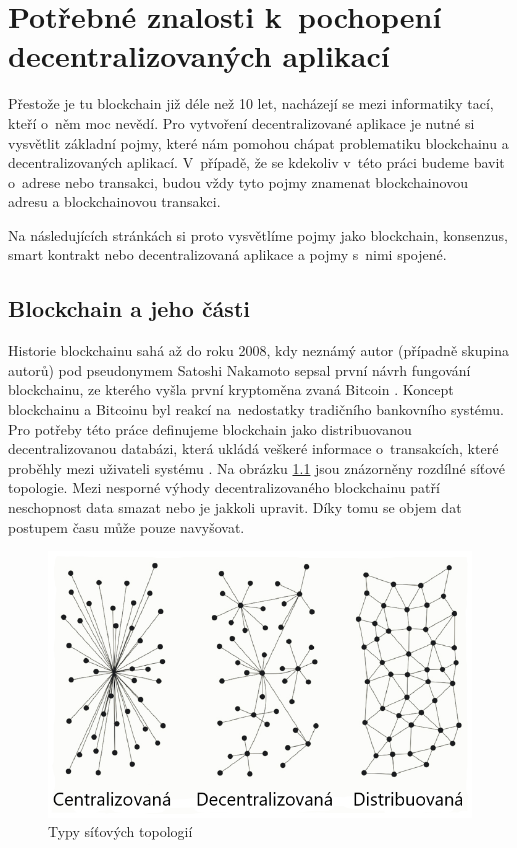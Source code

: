 \chapter{Potřebné znalosti k~pochopení decentralizovaných aplikací}
\label{chapter:2}
Přestože je tu blockchain již déle než 10 let, nacházejí se mezi informatiky tací, kteří o~něm moc nevědí. Pro vytvoření decentralizované aplikace je nutné si vysvětlit základní pojmy, které nám pomohou chápat problematiku blockchainu a decentralizovaných aplikací. V~případě, že se kdekoliv v~této práci budeme bavit o~adrese nebo transakci, budou vždy tyto pojmy znamenat blockchainovou adresu a blockchainovou transakci.

Na následujících stránkách si proto vysvětlíme pojmy jako blockchain, konsenzus, smart kontrakt nebo decentralizovaná aplikace a pojmy s~nimi spojené.

\section{Blockchain a jeho části}
Historie blockchainu sahá až do roku 2008, kdy neznámý autor (případně skupina autorů) pod pseudonymem Satoshi Nakamoto sepsal první návrh fungování blockchainu, ze kterého vyšla první kryptoměna zvaná Bitcoin \cite{Nakamoto2008}. Koncept blockchainu a Bitcoinu byl reakcí na~nedostatky tradičního bankovního systému. Pro potřeby této práce definujeme blockchain jako distribuovanou decentralizovanou databázi, která ukládá veškeré informace o~transakcích, které proběhly mezi uživateli systému \cite{Bashir2017}. Na obrázku \ref{fig:topologie} jsou znázorněny rozdílné síťové topologie. Mezi nesporné výhody decentralizovaného blockchainu patří neschopnost data smazat nebo je jakkoli upravit. Díky tomu se objem dat postupem času může pouze navyšovat.

\begin{figure}
\centering
\includegraphics[width=\textwidth]{obrazky/centralized-vs-decentralized-vs-distributed-processing.png}
\caption{Typy síťových topologií \cite{Topologie}} 
\label{fig:topologie}
\centering
\end{figure}

